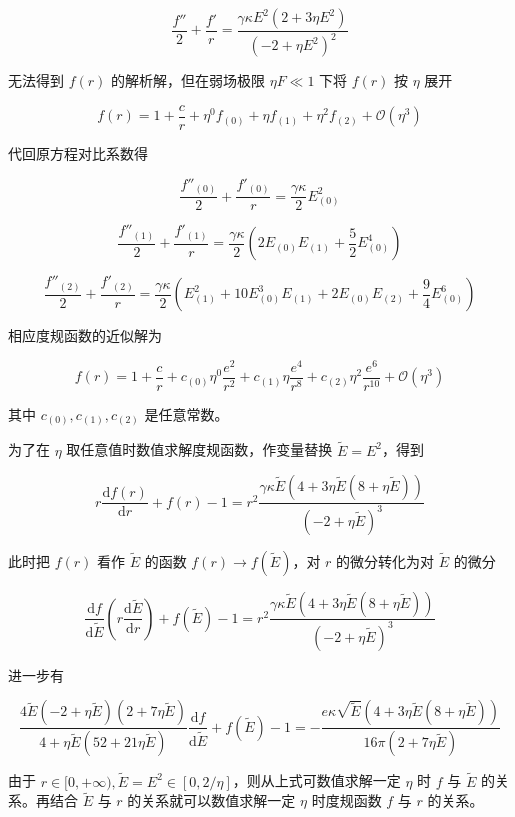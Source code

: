\documentclass[aps,prl,preprint,groupedaddress,showkeys]{revtex4-2}
\begin{document}
$$
\frac{f'' }{2 } + \frac{f' }{r } = \frac{\gamma \kappa E^2\left(2+3\eta E^2 \right) }{\left(-2+\eta E^2 \right)^2 }  
$$

无法得到 $f(r)$ 的解析解，但在弱场极限 $\eta F\ll 1$ 下将 $f(r)$ 按 $\eta$ 展开

$$
f(r)
=1+\frac{c }{r }+\eta^0 f_{(0)} + \eta f_{(1)} + \eta^2 f_{(2)} + \mathcal{O}\left(\eta^3 \right) 
$$

代回原方程对比系数得

$$
\frac{f''_{(0)} }{2 } + \frac{f'_{(0)} }{r }
=\frac{\gamma \kappa }{2 } E_{(0)}^2   
$$

$$
\frac{f''_{(1)} }{2 } + \frac{f'_{(1)} }{r } 
=\frac{\gamma\kappa }{2 } \left(2E_{(0)}E_{(1)}+\frac{5 }{2 } E_{(0)}^4 \right) 
$$

$$
\frac{f''_{(2)} }{2 } + \frac{f'_{(2)} }{r }
=\frac{\gamma\kappa }{2 }\left(E_{(1)}^2+10E_{(0)}^3E_{(1)}+2E_{(0)}E_{(2)}+\frac{9 }{4 } E_{(0)}^6 \right)   
$$

相应度规函数的近似解为

$$
f(r)
=1+\frac{c }{r }+c_{(0)}\eta^0\frac{e^2 }{r^2 } + c_{(1)}\eta\frac{e^4 }{r^8 } + c_{(2)}\eta^2\frac{e^6 }{r^{10} } + \mathcal{O}\left(\eta^3 \right)   
$$

其中 $c_{(0)},c_{(1)},c_{(2)}$ 是任意常数。

为了在 $\eta$ 取任意值时数值求解度规函数，作变量替换 $\tilde{E}=E^2$，得到

$$
r\frac{\mathrm{d}f(r) }{\mathrm{d}r } + f(r)-1
=r^2\frac{\gamma \kappa\tilde{E}\left(4+3\eta\tilde{E}\left(8+\eta\tilde{E} \right) \right) }{\left(-2+\eta\tilde{E} \right)^3 }  
$$

此时把 $f(r)$ 看作 $\tilde{E}$ 的函数 $f(r)\to f(\tilde{E})$，对 $r$ 的微分转化为对 $\tilde{E}$ 的微分

$$
\frac{\mathrm{d}f }{\mathrm{d}\tilde{E} }\left(r\frac{\mathrm{d}\tilde{E} }{\mathrm{d}r }  \right) + f(\tilde{E})-1
=r^2\frac{\gamma\kappa\tilde{E}\left(4+3\eta\tilde{E}\left(8+\eta\tilde{E} \right) \right) }{\left(-2+\eta\tilde{E} \right)^3 }  
$$

进一步有

$$
\frac{4\tilde{E}\left(-2+\eta\tilde{E} \right)\left(2+7\eta\tilde{E} \right) }{4+\eta\tilde{E}\left(52+21\eta\tilde{E} \right) }\frac{\mathrm{d}f }{\mathrm{d}\tilde{E} } + f(\tilde{E})-1
=-\frac{e\kappa \sqrt{\tilde{E}}\left(4+3\eta\tilde{E}\left(8+\eta\tilde{E} \right) \right) }{16\pi\left(2+7\eta\tilde{E} \right) }   
$$

由于 $r\in[0,+\infty),\tilde{E}=E^2\in[0,2/\eta]$，则从上式可数值求解一定 $\eta$ 时 $f$ 与 $\tilde{E}$ 的关系。再结合 $\tilde{E}$ 与 $r$ 的关系就可以数值求解一定 $\eta$ 时度规函数 $f$ 与 $r$ 的关系。 
\end{document}
